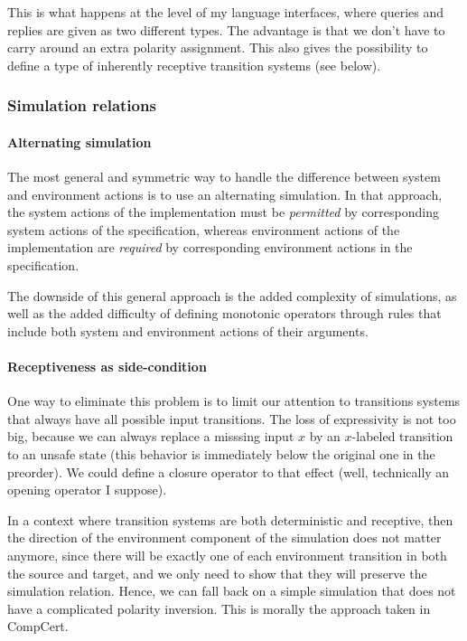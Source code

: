 \documentclass[11pt]{article}
\begin{document}
This is what happens at the level of my language interfaces,
where queries and replies are given
as two different types.
The advantage is that we don't have to carry around
an extra polarity assignment.
This also gives the possibility to define
a type of
inherently receptive transition systems (see below).


\subsubsection{Simulation relations} %

\paragraph{Alternating simulation}

The most general and symmetric way to
handle the difference between system and environment actions
is to use an alternating simulation.
In that approach,
the system actions of the implementation must be \emph{permitted}
by corresponding system actions of the specification,
whereas environment actions of the implementation are \emph{required}
by corresponding environment actions in the specification.

The downside of this general approach is
the added complexity of simulations,
as well as the added difficulty of defining
monotonic operators
through rules that include
both system and environment actions
of their arguments.

\paragraph{Receptiveness as side-condition}

One way to eliminate this problem is to limit our attention to
transitions systems that always have all possible input transitions.
The loss of expressivity is not too big,
because we can always replace a misssing input $x$
by an $x$-labeled transition to an unsafe state
(this behavior is immediately below the original one in the preorder).
We could define a closure operator to that effect
(well, technically an opening operator I suppose).

In a context where transition systems are
both deterministic and receptive,
then the direction of the environment component of the simulation
does not matter anymore,
since there will be exactly one of each environment transition
in both the source and target,
and we only need to show that they will preserve
the simulation relation.
Hence, we can fall back on a simple simulation
that does not have a complicated polarity inversion.
This is morally the approach taken in CompCert.
\end{document}
